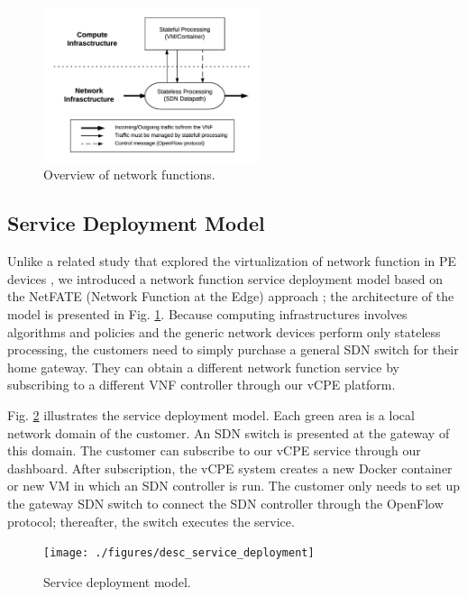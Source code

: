 \documentclass[conference]{IEEEtran}
\begin{document}
\begin{figure}[!t]
\centering
\includegraphics[width=2.5in]{./figures/desc_nfv_overview}
\caption{Overview of network functions.}
\label{fig:desc_nfv_overview}
\end{figure}



\subsection{Service Deployment Model}
Unlike a related study that explored the virtualization of network function in PE devices \cite{vcpe-enhance}, we introduced a network function service deployment model based on the NetFATE (Network Function at the Edge) approach \cite{netfate}; the architecture of the model is presented in Fig. \ref{fig:desc_nfv_overview}. Because computing infrastructures involves algorithms and policies and the generic network devices perform only stateless processing, the customers need to simply purchase a general SDN switch for their home gateway. They can obtain a different network function service by subscribing to a different VNF controller through our vCPE platform.

Fig. \ref{fig:desc_service_deployment} illustrates the service deployment model. Each green area is a local network domain of the customer. An SDN switch is presented at the gateway of this domain. The customer can subscribe to our vCPE service through our dashboard. After subscription, the vCPE system creates a new Docker container or new VM in which an SDN controller is run. The customer only needs to set up the gateway SDN switch to connect the SDN controller through the OpenFlow protocol; thereafter, the switch executes the service.

\begin{figure}[!t]
\centering
\texttt{[image: ./figures/desc\_service\_deployment]}
\caption{Service deployment model.}
\label{fig:desc_service_deployment}
\end{figure}
\end{document}
